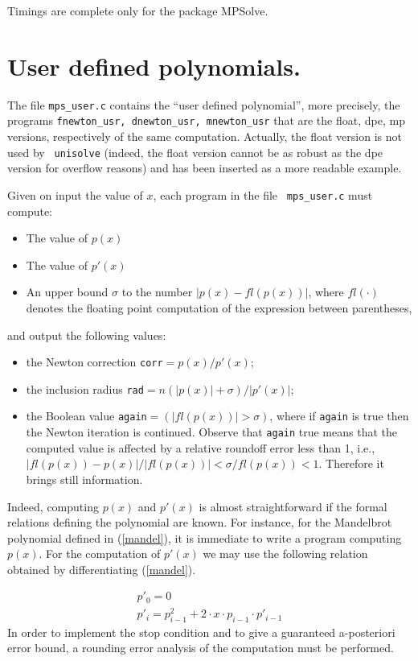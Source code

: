 \documentclass{article}
\begin{document}
Timings are complete only for the package MPSolve.

\section{User defined polynomials.}
The file {\tt mps\_user.c} contains the ``user defined polynomial'',
more precisely, the programs {\tt fnewton\_usr, dnewton\_usr,
mnewton\_usr} that are the float, dpe, mp versions, respectively of
the same computation.  Actually, the float version is not used by {\tt
unisolve} (indeed, the float version cannot be as robust as the dpe
version for overflow reasons) and has been inserted as a more readable
example.

Given on input the value of $x$, each program in the file {\tt
mps\_user.c} must compute:
\begin{itemize}
\item The value of $p(x)$
\item The value of $p'(x)$
\item An upper bound $\sigma$ to the number $|p(x)-fl(p(x))|$, 
      where $fl(\cdot)$ denotes the floating point computation of
      the expression between parentheses,
\end{itemize}
and output the following values:
\begin{itemize}
\item the Newton correction {\tt corr}$=p(x)/p'(x)$;
\item the inclusion radius {\tt rad}$=n(|p(x)|+\sigma)/|p'(x)|$;
\item the Boolean value {\tt again}$= (|fl(p(x))| > \sigma)$, where
      if {\tt again} is true then the Newton iteration is
      continued. Observe that {\tt again} true means that the
      computed value is affected by a relative roundoff error less
      than 1, i.e.,
      $|fl(p(x))-p(x)|/|fl(p(x))|<\sigma/fl(p(x))<1$. Therefore it
      brings still information.
\end{itemize} 

Indeed, computing $p(x)$ and $p'(x)$ is almost straightforward if the
formal relations defining the polynomial are known.  For instance, for
the Mandelbrot polynomial defined in (\ref{mandel}), it is immediate
to write a program computing $p(x)$. For the computation of $p'(x)$ we
may use the following relation obtained by differentiating
(\ref{mandel}).

\[
\begin{array}{l}
p'_0=0 \\ p'_{i}=p_{i-1}^2+2\cdot x\cdot p_{i-1}\cdot p'_{i-1}
\end{array}
\]
In order to implement the stop condition and to give a guaranteed
a-posteriori error bound, a rounding error analysis of the computation
must be performed.
\end{document}
